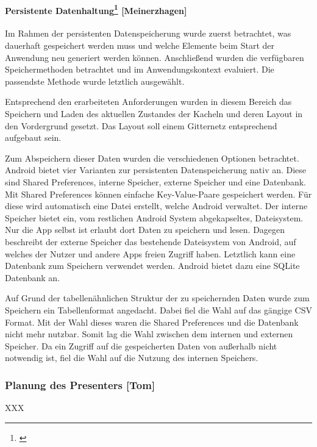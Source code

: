 \paragraph{Persistente Datenhaltung\protect\footnote{\cite[vgl.][]{ogbo2016}} [Meinerzhagen]}

Im Rahmen der persistenten Datenspeicherung wurde zuerst betrachtet, was dauerhaft gespeichert werden muss und welche Elemente beim Start der Anwendung neu generiert werden können. Anschließend wurden die verfügbaren Speichermethoden betrachtet und im Anwendungskontext evaluiert. Die passendste Methode wurde letztlich ausgewählt.

Entsprechend den erarbeiteten Anforderungen wurden in diesem Bereich das Speichern und Laden des aktuellen Zustandes der Kacheln und deren Layout in den Vordergrund gesetzt. Das Layout soll einem Gitternetz entsprechend aufgebaut sein.

Zum Abspeichern dieser Daten wurden die verschiedenen Optionen betrachtet. Android bietet vier Varianten zur persistenten Datenspeicherung nativ an. Diese sind Shared Preferences, interne Speicher, externe Speicher und eine Datenbank. Mit Shared Preferences können einfache Key-Value-Paare gespeichert werden. Für diese wird automatisch eine Datei erstellt, welche Android verwaltet. Der interne Speicher bietet ein, vom restlichen Android System abgekapseltes, Dateisystem. Nur die App selbst ist erlaubt dort Daten zu speichern und lesen. Dagegen beschreibt der externe Speicher das bestehende Dateisystem von Android, auf welches der Nutzer und andere Apps freien Zugriff haben. Letztlich kann eine Datenbank zum Speichern verwendet werden. Android bietet dazu eine SQLite Datenbank an.

Auf Grund der tabellenähnlichen Struktur der zu speichernden Daten wurde zum Speichern ein Tabellenformat angedacht. Dabei fiel die Wahl auf das gängige CSV Format. Mit der Wahl dieses waren die Shared Preferences und die Datenbank nicht mehr nutzbar. Somit lag die Wahl zwischen dem internen und externen Speicher. Da ein Zugriff auf die gespeicherten Daten von außerhalb nicht notwendig ist, fiel die Wahl auf die Nutzung des internen Speichers. 

\clearpage

\subsubsection{Planung des Presenters [Tom]}

XXX

